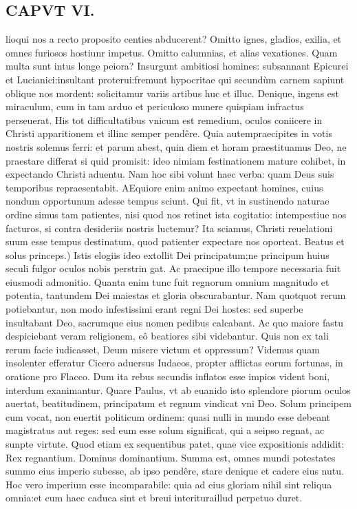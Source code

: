 \documentclass{article}
\begin{document}
\begin{pages}
\section*{CAPVT VI. }
\marginpar{[ p.81 ]}\pstart lioqui nos a recto proposito centies abducerent? Omitto ignes, gladios, exilia, et omnes furiosos hostiunr impetus. Omitto calumnias, et alias vexationes. Quam multa sunt intus longe peiora? Insurgunt ambitiosi homines: subsannant Epicurei et Lucianici:insultant proterui:fremunt hypocritae qui secundùm carnem sapiunt oblique nos mordent: solicitamur variis artibus huc et illuc. Denique, ingens est miraculum, cum in tam arduo et periculoso munere quispiam infractus perseuerat. His tot difficultatibus vnicum est remedium, oculos coniicere in Christi apparitionem et illinc semper pendêre. Quia autempraecipites in votis nostris solemus ferri: et parum abest, quin diem et horam praestituamus Deo, ne praestare differat si quid promisit: ideo nimiam festinationem mature cohibet, in expectando Christi aduentu. Nam hoc sibi volunt haec verba: quam Deus suis temporibus repraesentabit. AEquiore enim animo expectant homines, cuius nondum opportunum adesse tempus sciunt. Qui fit, vt in sustinendo naturae ordine simus tam patientes, nisi quod nos retinet ista cogitatio: intempestiue nos facturos, si contra desideriis nostris luctemur? Ita sciamus, Christi reuelationi suum esse tempus destinatum, quod patienter expectare nos oporteat.  \pend\pstart Beatus et solus princeps.) Istis elogiis ideo extollit Dei principatum;ne principum huius seculi fulgor oculos nobis perstrin gat. Ac praecipue illo tempore necessaria fuit eiusmodi admonitio. Quanta enim tunc fuit regnorum omnium magnitudo et potentia, tantundem Dei maiestas et gloria obscurabantur. Nam quotquot rerum potiebantur, non modo infestissimi erant regni Dei hostes: sed superbe insultabant Deo, sacrumque eius nomen pedibus calcabant. Ac quo maiore fastu despiciebant veram religionem, eô beatiores sibi videbantur. Quis non ex tali rerum facie iudicasset, Deum misere victum et oppressum? Videmus quam insolenter efferatur Cicero aduersus Iudaeos, propter afflictas eorum fortunas, in oratione pro Flacco. Dum ita rebus secundis inflatos esse impios vident boni, interdum exanimantur. Quare Paulus, vt ab euanido isto splendore piorum oculos auertat, beatitudinem, principatum et regnum vindicat vni Deo. Solum principem cum vocat, non euertit politicum ordinem: quasi nulli in mundo esse debeant magistratus aut reges: sed eum esse solum significat, qui a seipso regnat, ac sunpte virtute. Quod etiam ex sequentibus patet, quae vice expositionis addidit: Rex regnantium. Dominus dominantium. Summa est, omnes mundi potestates summo eius imperio subesse, ab ipso pendêre, stare denique et cadere eius nutu. Hoc vero imperium esse incomparabile: quia ad eius gloriam nihil sint reliqua omnia:et cum haec caduca sint et breui interituraillud perpetuo duret.  \pend

\end{pages}
\end{document}
